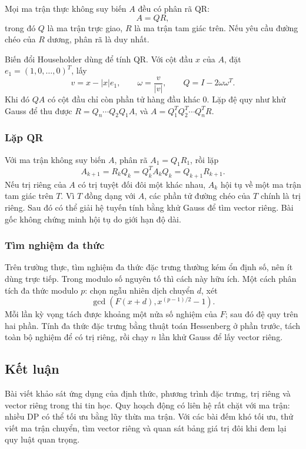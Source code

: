 \documentclass[11pt]{article}
\begin{document}
Mọi ma trận thực không suy biến \(A\) đều có phân rã QR:
\[
  A=QR,
\]
trong đó \(Q\) là ma trận trực giao, \(R\) là ma trận tam giác trên. Nếu yêu cầu
đường chéo của \(R\) dương, phân rã là duy nhất.

Biến đổi Householder dùng để tính QR. Với cột đầu \(x\) của \(A\), đặt
\(e_1=(1,0,\ldots,0)^T\), lấy
\[
  v=x-|x|e_1,\qquad \omega=\frac{v}{|v|},\qquad Q=I-2\omega\omega^T.
\]
Khi đó \(QA\) có cột đầu chỉ còn phần tử hàng đầu khác \(0\). Lặp đệ quy như
khử Gauss để thu được \(R=Q_n\cdots Q_2Q_1A\), và
\(A=Q_1^TQ_2^T\cdots Q_n^TR\).

\subsubsection{Lặp QR}

Với ma trận không suy biến \(A\), phân rã \(A_1=Q_1R_1\), rồi lặp
\[
  A_{k+1}=R_kQ_k=Q_k^TA_kQ_k=Q_{k+1}R_{k+1}.
\]
Nếu trị riêng của \(A\) có trị tuyệt đối đôi một khác nhau, \(A_k\) hội tụ về
một ma trận tam giác trên \(T\). Vì \(T\) đồng dạng với \(A\), các phần tử đường
chéo của \(T\) chính là trị riêng. Sau đó có thể giải hệ tuyến tính bằng khử
Gauss để tìm vector riêng. Bài gốc không chứng minh hội tụ do giới hạn độ dài.

\subsubsection{Tìm nghiệm đa thức}

Trên trường thực, tìm nghiệm đa thức đặc trưng thường kém ổn định số, nên ít
dùng trực tiếp. Trong modulo số nguyên tố thì cách này hữu ích. Một cách phân
tích đa thức modulo \(p\): chọn ngẫu nhiên dịch chuyển \(d\), xét
\[
  \gcd(F(x+d),x^{(p-1)/2}-1).
\]
Mỗi lần kỳ vọng tách được khoảng một nửa số nghiệm của \(F\); sau đó đệ quy
trên hai phần. Tính đa thức đặc trưng bằng thuật toán Hessenberg ở phần trước,
tách toàn bộ nghiệm để có trị riêng, rồi chạy \(n\) lần khử Gauss để lấy vector
riêng.

\subsection{Kết luận}

Bài viết khảo sát ứng dụng của định thức, phương trình đặc trưng, trị riêng và
vector riêng trong thi tin học. Quy hoạch động có liên hệ rất chặt với ma trận:
nhiều DP có thể tối ưu bằng lũy thừa ma trận. Với các bài đếm khó tối ưu, thử
viết ma trận chuyển, tìm vector riêng và quan sát bảng giá trị đôi khi đem lại
quy luật quan trọng.
\end{document}
